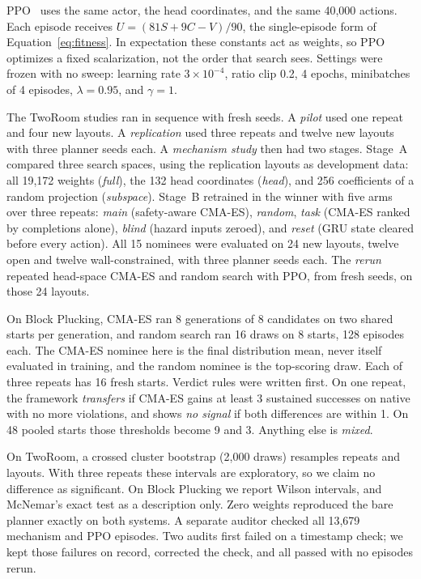 \documentclass[dvipsnames,format=sigconf]{acmart}
\newcommand{\cmaes}{CMA-ES}
\begin{document}
PPO~\cite{schulman2017ppo} uses the same actor, the head coordinates, and the same 40,000 actions. Each
episode receives $U=(81S+9C-V)/90$, the single-episode form of Equation~\ref{eq:fitness}. In expectation
these constants act as weights, so PPO optimizes a fixed scalarization, not the order that search
sees. Settings were frozen with no sweep: learning rate $3\times10^{-4}$, ratio clip 0.2, 4 epochs,
minibatches of 4 episodes, $\lambda=0.95$, and $\gamma=1$. %

The TwoRoom studies ran in sequence with fresh seeds. A \emph{pilot} used one repeat and four new
layouts. A \emph{replication} used three repeats and twelve new layouts with three planner seeds each.
A \emph{mechanism study} then had two stages. Stage~A compared three search spaces, using the
replication layouts as development data: all 19,172 weights (\emph{full}), the 132 head coordinates
(\emph{head}), and 256 coefficients of a random projection (\emph{subspace}). Stage~B retrained in the
winner with five arms over three repeats: \emph{main} (safety-aware \cmaes{}), \emph{random},
\emph{task} (\cmaes{} ranked by completions alone), \emph{blind} (hazard inputs zeroed), and
\emph{reset} (GRU state cleared before every action). All 15 nominees were evaluated on 24 new layouts,
twelve open and twelve wall-constrained, with three planner seeds each. %
The \emph{rerun} repeated head-space \cmaes{} and random search with PPO, from fresh seeds, on those
24 layouts.

On Block Plucking, \cmaes{} ran 8 generations of 8 candidates on two shared starts per generation, and
random search ran 16 draws on 8 starts, 128 episodes each. The \cmaes{} nominee here is the final
distribution mean, never itself evaluated in training, and the random nominee is the top-scoring draw.
Each of three repeats has 16 fresh starts. Verdict rules were
written first. On one repeat, the framework \emph{transfers} if \cmaes{} gains at least 3 sustained
successes on native with no more violations, and shows \emph{no signal} if both differences are within
1. On 48 pooled starts those thresholds become 9 and 3. Anything else is \emph{mixed}. %

On TwoRoom, a crossed cluster bootstrap (2,000 draws) resamples repeats and layouts. With three repeats
these intervals are exploratory, so we claim no difference as significant. On Block Plucking we report
Wilson intervals, and McNemar's exact test as a description only. Zero weights reproduced the bare
planner exactly on both systems. A separate auditor checked all 13,679 mechanism and PPO episodes. Two
audits first failed on a timestamp check; we kept those failures on record, corrected the check, and all
passed with no episodes rerun. %
\end{document}
